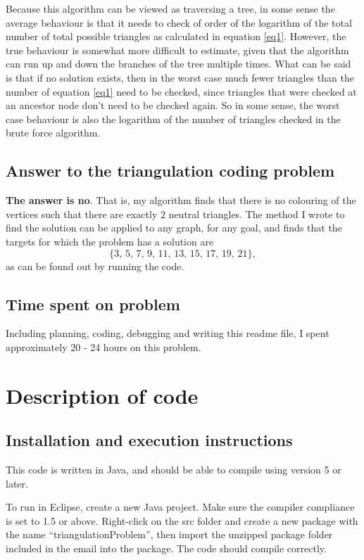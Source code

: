\documentclass[letterpaper,10pt]{article}
\begin{document}
Because this algorithm can be viewed as traversing a tree, in some sense the average behaviour is that it needs to check of order of the logarithm 
of the total number of total possible triangles as calculated in equation \ref{eq1}.  However, the true behaviour is somewhat more difficult to 
estimate, given that the algorithm can run up and down the branches of the tree multiple times.  What can be said is that if no solution exists, then in the worst case 
much fewer triangles than the number of equation \ref{eq1} need to be checked, 
since triangles that were checked at an ancestor node don't need to be checked again.  So in some sense, the worst case behaviour 
is also the logarithm of the number of triangles checked in the brute force algorithm.

\subsection{Answer to the triangulation coding problem}
\textbf{The answer is no}.  That is, my algorithm finds that there is no colouring of the vertices such that there are exactly $2$ neutral triangles.
The method I wrote to find the solution can be applied to any graph, for any goal, and finds that the targets for which the problem has a solution are 
\begin{equation}
 \{3,\,5,\,7,\,9,\,11,\,13,\,15,\,17,\,19,\,21\},
\end{equation}
as can be found out by running the code.

\subsection{Time spent on problem}

Including planning, coding, debugging and writing this readme file, I spent approximately 20 - 24 hours on this problem.

\section{Description of code}
\subsection{Installation and execution instructions}
This code is written in Java, and should be able to compile using version 5 or later.

To run in Eclipse, create a new Java project.  Make sure the 
compiler compliance is set to 1.5 or above.  Right-click on the 
src folder and create a new package with the name ``triangulationProblem'', then import the unzipped package folder included in the email into the package.  
The code should compile correctly.
\end{document}
